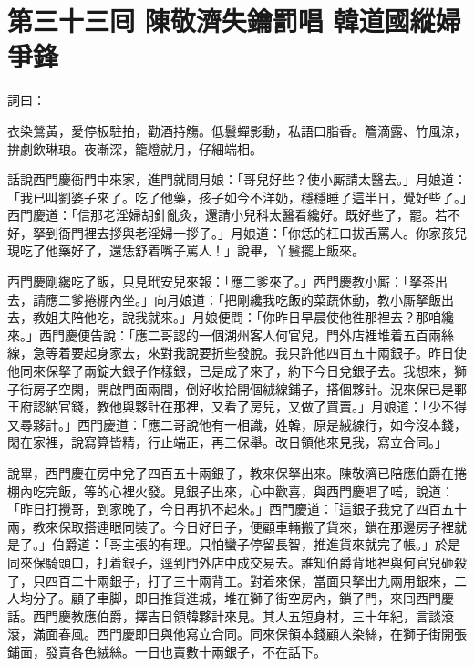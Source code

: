 
\chapter*{第三十三囘 陳敬濟失鑰罰唱 韓道國縱婦爭鋒}


詞曰：

\begin{myquote} 
衣染鶯黃，愛停板駐拍，勸酒持觴。低鬟蟬影動，私語口脂香。簷滴露、竹風涼，拚劇飲琳琅。夜漸深，籠燈就月，仔細端相。

\end{myquote} 

話說西門慶衙門中來家，進門就問月娘：「哥兒好些？使小厮請太醫去。」月娘道：「我已叫劉婆子來了。吃了他藥，孩子如今不洋奶，穩穩睡了這半日，覺好些了。」西門慶道：「信那老淫婦胡針亂灸，還請小兒科太醫看纔好。既好些了，罷。若不好，拏到衙門裡去拶與老淫婦一拶子。」月娘道：「你恁的枉口拔舌罵人。你家孩兒現吃了他藥好了，還恁舒着嘴子罵人！」說畢，丫鬟擺上飯來。

西門慶剛纔吃了飯，只見玳安兒來報：「應二爹來了。」西門慶教小厮：「拏茶出去，請應二爹捲棚內坐。」向月娘道：「把剛纔我吃飯的菜蔬休動，教小厮拏飯出去，教姐夫陪他吃，說我就來。」月娘便問：「你昨日早晨使他徃那裡去？那咱纔來。」西門慶便告說：「應二哥認的一個湖州客人何官兒，門外店裡堆着五百兩絲線，急等着要起身家去，來對我說要折些發脫。我只許他四百五十兩銀子。昨日使他同來保拏了兩錠大銀子作樣銀，已是成了來了，約下今日兌銀子去。我想來，獅子街房子空閑，開啟門面兩間，倒好收拾開個絨線鋪子，搭個夥計。況來保已是鄆王府認納官錢，教他與夥計在那裡，又看了房兒，又做了買賣。」月娘道：「少不得又尋夥計。」西門慶道：「應二哥說他有一相識，姓韓，原是絨線行，如今沒本錢，閑在家裡，說寫算皆精，行止端正，再三保舉。改日領他來見我，寫立合同。」

說畢，西門慶在房中兌了四百五十兩銀子，教來保拏出來。陳敬濟已陪應伯爵在捲棚內吃完飯，等的心裡火發。見銀子出來，心中歡喜，與西門慶唱了喏，說道：「昨日打攪哥，到家晚了，今日再扒不起來。」西門慶道：「這銀子我兌了四百五十兩，教來保取搭連眼同裝了。今日好日子，便顧車輛搬了貨來，鎖在那邊房子裡就是了。」伯爵道：「哥主張的有理。只怕蠻子停留長智，推進貨來就完了帳。」於是同來保騎頭口，打着銀子，逕到門外店中成交易去。誰知伯爵背地裡與何官兒砸殺了，只四百二十兩銀子，打了三十兩背工。對着來保，當面只拏出九兩用銀來，二人均分了。顧了車脚，即日推貨進城，堆在獅子街空房內，鎖了門，來囘西門慶話。西門慶教應伯爵，擇吉日領韓夥計來見。其人五短身材，三十年紀，言談滾滾，滿面春風。西門慶即日與他寫立合同。同來保領本錢顧人染絲，在獅子街開張鋪面，發賣各色絨絲。一日也賣數十兩銀子，不在話下。


